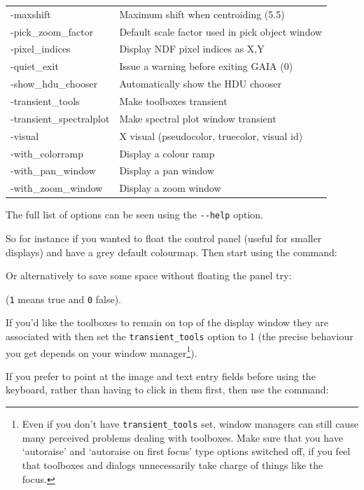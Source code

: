 \documentclass[twoside,11pt,nolof]{starlink}
\providecommand{\mytt}[1]{{\texttt{#1}}}
\begin{document}
{\begin{tabular}{l|l}
 -maxshift           &  Maximum shift when centroiding (5.5) \\
 -pick\_zoom\_factor &  Default scale factor used in pick object window \\
 -pixel\_indices     &  Display NDF pixel indices as X,Y \\
 -quiet\_exit        &  Issue a warning before exiting GAIA (0)\\
 -show\_hdu\_chooser &  Automatically show the HDU chooser \\
 -transient\_tools   &  Make toolboxes transient \\
 -transient\_spectralplot   &  Make spectral plot window transient \\
 -visual             &  X visual (pseudocolor, truecolor, visual id)\\
 -with\_colorramp    &  Display a colour ramp \\
 -with\_pan\_window  &  Display a pan window \\
 -with\_zoom\_window &  Display a zoom window
\end{tabular}
}

The full list of options can be seen using the \verb#--help# option.

So for instance if you wanted to float the control panel (useful for
smaller displays) and have a grey default colourmap. Then start
using the command:
\begin{terminalv}
\end{terminalv}
Or alternatively to save some space without floating the panel try:
\begin{terminalv}
\end{terminalv}
(\mytt{1} means true and \mytt{0} false).

If you'd like the toolboxes to remain on top of the display window
they are associated with then set the \mytt{transient\_tools} option
to 1 (the precise behaviour you get depends on your window
manager\footnote{Even if you don't have \mytt{transient\_tools} set,
window managers can still cause many perceived problems dealing with
toolboxes. Make sure that you have `autoraise' and `autoraise on first
focus' type options switched off, if you feel that toolboxes and
dialogs unnecessarily take charge of things like the focus.}).

If you prefer to point at the image and text entry fields before using
the keyboard, rather than having to click in them first, then use the
command:
\begin{terminalv}
\end{terminalv}
\end{document}
